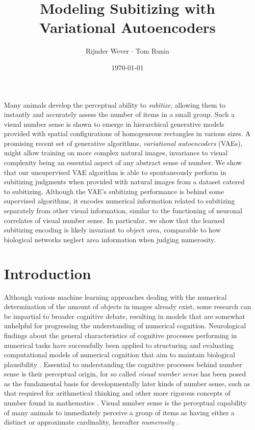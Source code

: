 \documentclass[twocolumn]{article}
\title{Modeling Subitizing with Variational Autoencoders}
\author{Rijnder Wever \(\cdot\) Tom Runia}
\affil{University of Amsterdam} %
\date{\today}
\renewenvironment{abstract}
               {\list{}{\leftmargin}%
                \item[\hspace{7mm}\textbf{Abstract}]\relax}
               {\endlist}
\begin{document}
\maketitle

\begin{abstract}
Many animals develop the perceptual ability to \emph{subitize}, allowing them to instantly and accurately assess the number of items in a small group. Such a visual number sense is shown to emerge in hierarchical generative models provided with spatial configurations of homogeneous rectangles in various sizes. A promising recent set of generative algorithms,  \emph{variational autoencoders} (VAEs), might allow training on more complex natural images, invariance to visual complexity being an essential aspect of any abstract sense of number. We show that our unsupervised VAE algorithm is able to spontaneously perform in subitizing judgments when provided with natural images from a dataset catered to subitizing. Although the VAE's subitizing performance is behind some supervised algorithms, it encodes numerical information related to subitizing separately from other visual information, similar to the functioning of neuronal correlates of visual number sense. In particular, we show that the learned subitizing encoding is likely invariant to object area, comparable to how biological networks neglect area information when judging numerosity.
\end{abstract}

\hypertarget{introduction}{%
\section{Introduction}\label{introduction}}

Although various machine learning approaches dealing with the numerical
determination of the amount of objects in images already exist, some
research can be impartial to broader cognitive debate, resulting in
models that are somewhat unhelpful for progressing the understanding of
numerical cognition. Neurological findings about the general characteristics of cognitive processes performing in numerical tasks have successfully been applied to structuring and evaluating computational models of numerical cognition that aim to maintain biological plausibility \citep{stoianov2012, zhang2016salient}.
Essential to understanding the
cognitive processes behind number sense is their perceptual origin, for
so called \emph{visual number sense} has been posed as the fundamental
basis for developmentally later kinds of number sense, such as that
required for arithmetical thinking and other more rigorous concepts of
number found in mathematics \citetext{\citealp[ chap.
2]{lakoff}; \citealp{numerosity-basis}}. Visual number sense is the
perceptual capability of many animals to immediately perceive a group of items as
having either a distinct or approximate cardinality, hereafter \emph{numerosity} \citep{feigenson2004core}. 
\end{document}
